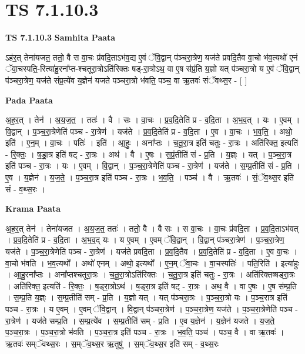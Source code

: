 \documentclass[17pt]{extarticle}
\begin{document}
\section{ TS 7.1.10.3 }

\textbf{TS 7.1.10.3 } \newline
\textbf{Samhita Paata} \newline

ऽह॑र॒त् तेना॑यजत॒ ततो॒ वै स वा॒चः प्र॑वदि॒ताऽभ॑व॒द्य ए॒वं ॅवि॒द्वान् प॑ञ्चरा॒त्रेण॒ यज॑ते प्रवदि॒तैव वा॒चो भ॑व॒त्यथो॑ एनं ॅवा॒चस्पति॒-रित्या॑हु॒रना᳚प्त-श्चतूरा॒त्रोऽति॑रिक्तः षड्-रा॒त्रोऽथ॒ वा ए॒ष स॑प्रं॒ति य॒ज्ञो यत् प॑ञ्चरा॒त्रो य ए॒वं ॅवि॒द्वान् प॑ञ्चरा॒त्रेण॒ यज॑ते संप्र॒त्ये॑व य॒ज्ञेन॑ यजते पञ्चरा॒त्रो भ॑वति॒ पञ्च॒ वा ऋ॒तवः॑ संॅवथ्स॒र - [  ] \newline

\textbf{Pada Paata} \newline

अ॒ह॒र॒त् । तेन॑ । अ॒य॒ज॒त॒ । ततः॑ । वै । सः । वा॒चः । प्र॒व॒दि॒तेति॑ प्र - व॒दि॒ता । अ॒भ॒व॒त् । यः । ए॒वम् । वि॒द्वान् । प॒ञ्च॒रा॒त्रेणेति॑ पञ्च - रा॒त्रेण॑ । यज॑ते । प्र॒व॒दि॒तेति॑ प्र - व॒दि॒ता । ए॒व । वा॒चः । भ॒व॒ति॒ । अथो॒ इति॑ । ए॒न॒म् । वा॒चः । पतिः॑ । इति॑ । आ॒हुः॒ । अना᳚प्तः । च॒तू॒रा॒त्र इति॑ चतुः - रा॒त्रः । अति॑रिक्त॒ इत्यति॑ - रि॒क्तः॒ । ष॒ड्रा॒त्र इति॑ षट् - रा॒त्रः । अथ॑ । वै । ए॒षः । स॒प्रं॒तीति॑ सं - प्र॒ति । य॒ज्ञ्ः । यत् । प॒ञ्च॒रा॒त्र इति॑ पञ्च - रा॒त्रः । यः । ए॒वम् । वि॒द्वान् । प॒ञ्च॒रा॒त्रेणेति॑ पञ्च - रा॒त्रेण॑ । यज॑ते । स॒म्प्र॒तीति॑ सं - प्र॒ति । ए॒व । य॒ज्ञेन॑ । य॒ज॒ते॒ । प॒ञ्च॒रा॒त्र इति॑ पञ्च - रा॒त्रः । भ॒व॒ति॒ । पञ्च॑ । वै । ऋ॒तवः॑ । सं॒ॅव॒थ्स॒र इति॑ सं - व॒थ्स॒रः ।  \newline


\textbf{Krama Paata} \newline

अ॒ह॒र॒त् तेन॑ । तेना॑यजत । अ॒य॒ज॒त॒ ततः॑ । ततो॒ वै । वै सः । स वा॒चः । वा॒चः प्र॑वदि॒ता । प्र॒व॒दि॒ताऽभ॑वत् । प्र॒व॒दि॒तेति॑ प्र - व॒दि॒ता । अ॒भ॒व॒द् यः । य ए॒वम् । ए॒वम् ॅवि॒द्वान् । वि॒द्वान् प॑ञ्चरा॒त्रेण॑ । प॒ञ्च॒रा॒त्रेण॒ यज॑ते । प॒ञ्च॒रा॒त्रेणेति॑ पञ्च - रा॒त्रेण॑ । यज॑ते प्रवदि॒ता । प्र॒व॒दि॒तैव । प्र॒व॒दि॒तेति॑ प्र - व॒दि॒ता । ए॒व वा॒चः । वा॒चो भ॑वति । भ॒व॒त्यथो᳚ । अथो॑ एनम् । अथो॒ इत्यथो᳚ । ए॒न॒म् ॅवा॒चः । वा॒चस्पतिः॑ । पति॒रिति॑ । इत्या॑हुः । आ॒हु॒रना᳚प्तः । अना᳚प्तश्चतूरा॒त्रः । च॒तू॒रा॒त्रोऽति॑रिक्तः । च॒तू॒रा॒त्र इति॑ चतुः - रा॒त्रः । अति॑रिक्तष्षड्‍रा॒त्रः । अति॑रिक्त॒ इत्यति॑ - रि॒क्तः॒ । ष॒ड्‍रा॒त्रोऽथ॑ । ष॒ड्‍रा॒त्र इति॑ षट् - रा॒त्रः । अथ॒ वै । वा ए॒षः । ए॒ष स॑म्प्र॒ति । स॒म्प्र॒ति य॒ज्ञ्ः । स॒म्प्र॒तीति॑ सम् - प्र॒ति । य॒ज्ञो यत् । यत् प॑ञ्चरा॒त्रः । प॒ञ्च॒रा॒त्रो यः । प॒ञ्च॒रात्र इति॑ पञ्च - रा॒त्रः । य ए॒वम् । ए॒वम् ॅवि॒द्वान् । वि॒द्वान् प॑ञ्चरा॒त्रेण॑ । प॒ञ्च॒रा॒त्रेण॒ यज॑ते । प॒ञ्च॒रा॒त्रेणेति॑ पञ्च - रा॒त्रेण॑ । यज॑ते सम्प्र॒ति । स॒म्प्र॒त्ये॑व । स॒म्प्र॒तीति॑ सम् - प्र॒ति । ए॒व य॒ज्ञेन॑ । य॒ज्ञेन॑ यजते । य॒ज॒ते॒ प॒ञ्च॒रा॒त्रः । प॒ञ्च॒रा॒त्रो भ॑वति । प॒ञ्च॒रा॒त्र इति॑ पञ्च - रा॒त्रः । भ॒व॒ति॒ पञ्च॑ । पञ्च॒ वै । वा ऋ॒तवः॑ । ऋ॒तवः॑ सम्ॅवथ्स॒रः । स॒म्ॅव॒थ्स॒र ऋ॒तुषु॑ । स॒म्ॅव॒थ्स॒र इति॑ सम् - व॒थ्स॒रः \newline
\end{document}
